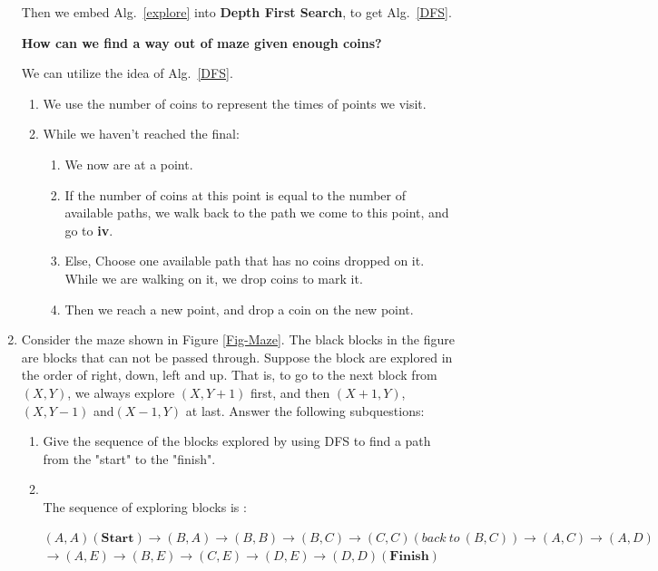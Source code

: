 \documentclass[12pt,a4paper]{article}
\makeatletter
\newtheorem*{solution}{Solution}
\theoremstyle{definition}
\renewenvironment{solution}[1][Solution] {\par\pushQED{\qed}\normalfont\topsep6\p@\@plus6\p@\relax\trivlist\item[\hskip\labelsep\bfseries#1\@addpunct{.}]\ignorespaces}{\popQED\endtrivlist\@endpefalse} \makeatother
\makeatother
\begin{document}
\begin{enumerate}
    Then we embed Alg.~\ref{explore} into \textbf{Depth First Search}, to get Alg.~\ref{DFS}.
    
    
    \textbf{How can we find a way out of maze given enough coins?} 
    
    We can utilize the idea of Alg.~\ref{DFS}.
    \begin{enumerate}
        \item We use the number of coins to represent the times of points we visit.
        \item While we haven't reached the final:
        \begin{enumerate}
            \item We now are at a point.
            \item If the number of coins at this point is equal to the number of available paths, we walk back to the path we come to this point, and go to \textbf{iv}.
            \item Else, Choose one available path that has no coins dropped on it. While we are walking on it, we drop coins to mark it.
            \item Then we reach a new point, and drop a coin on the new point.
        \end{enumerate}
    \end{enumerate}
    
    \item Consider the maze shown in Figure \ref{Fig-Maze}. The black blocks in the figure are blocks that can not be passed through. Suppose the block are explored in the order of right, down, left and up. That is, to go to the next block from $(X,Y)$, we always explore $(X,Y+1)$ first, and then $(X+1,Y)$,$(X,Y-1)$ and$(X-1,Y)$ at last. Answer the following subquestions:
    \begin{enumerate}
        \item Give the sequence of the blocks explored by using DFS to find a path from the "start" to the "finish".
        \begin{solution}
        ~\\
        The sequence of exploring blocks is :
        
        $
        (A,A)(\mathbf{Start})\rightarrow (B,A) \rightarrow (B,B) \rightarrow (B,C) \rightarrow (C,C) (back\ to\  (B,C))\rightarrow (A,C) \rightarrow (A,D)
        $
        $
        \rightarrow (A,E) \rightarrow (B,E) \rightarrow (C,E) \rightarrow (D,E) \rightarrow (D,D)(\mathbf{Finish})
        $
~\\


\end{solution}
\end{enumerate}
\end{enumerate}
\end{document}

